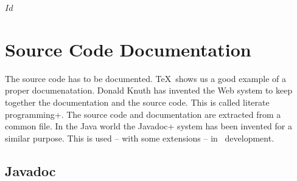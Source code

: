 \SVN$Id$
\chapter{Source Code Documentation}


The source code has to be documented. \TeX\ shows us a good example of
a proper documenatation. Donald Knuth has invented
the Web system to keep together the documentation and the source code.
This is called \+literate programming+. The source code and
documentation are extracted from a common file. In the Java world the
\+Javadoc+ system has been invented for a similar purpose. This is
used -- with some extensions -- in \ExTeX\ development.


\section{Javadoc}

